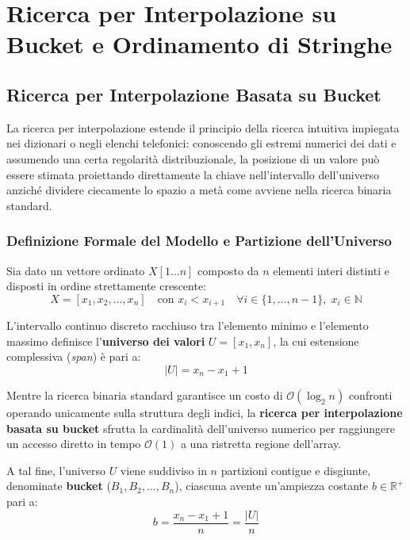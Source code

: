 \chapter{Ricerca per Interpolazione su Bucket e Ordinamento di Stringhe}
\label{chap:string-sorting-search}

\FloatBarrier
\section{Ricerca per Interpolazione Basata su Bucket}
\label{sec:bucket-interpolation-search}

La ricerca per interpolazione estende il principio della ricerca intuitiva impiegata nei dizionari o negli elenchi telefonici: conoscendo gli estremi numerici dei dati e assumendo una certa regolarit\`a distribuzionale, la posizione di un valore pu\`o essere stimata proiettando direttamente la chiave nell'intervallo dell'universo anzich\'e dividere ciecamente lo spazio a met\`a come avviene nella ricerca binaria standard.

\FloatBarrier
\subsection{Definizione Formale del Modello e Partizione dell'Universo}
\label{subsec:modello-bucket-interpolation}

Sia dato un vettore ordinato $X[1 \dots n]$ composto da $n$ elementi interi distinti e disposti in ordine strettamente crescente:
\begin{equation}
  X = [x_1, x_2, \dots, x_n] \quad \text{con } x_i < x_{i+1} \quad \forall i \in \{1, \dots, n-1\}, \; x_i \in \mathbb{N}
\end{equation}

L'intervallo continuo discreto racchiuso tra l'elemento minimo e l'elemento massimo definisce l'\textbf{universo dei valori} $U = [x_1, x_n]$, la cui estensione complessiva (\textit{span}) \`e pari a:
\begin{equation}
  |U| = x_n - x_1 + 1
\end{equation}

Mentre la ricerca binaria standard garantisce un costo di $\mathcal{O}(\log_2 n)$ confronti operando unicamente sulla struttura degli indici, la \textbf{ricerca per interpolazione basata su bucket} sfrutta la cardinalit\`a dell'universo numerico per raggiungere un accesso diretto in tempo $\mathcal{O}(1)$ a una ristretta regione dell'array. 

A tal fine, l'universo $U$ viene suddiviso in $n$ partizioni contigue e disgiunte, denominate \textbf{bucket} ($B_1, B_2, \dots, B_n$), ciascuna avente un'ampiezza costante $b \in \mathbb{R}^+$ pari a:
\begin{equation}
  b = \frac{x_n - x_1 + 1}{n} = \frac{|U|}{n}
\end{equation}

